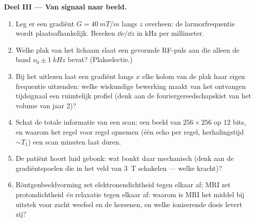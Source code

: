 \begin{problem}
\medskip\noindent\textbf{Deel III --- Van signaal naar beeld.}
\begin{enumerate}[resume]
  \item Leg er een gradiënt $G = \qty{40}{mT/m}$ langs $z$ overheen: de
        larmorfrequentie wordt plaatsafhankelijk. Bereken $\dd\nu/\dd z$
        in kHz per millimeter.
  \item Welke plak van het lichaam slaat een gevormde RF-puls aan die
        alleen de band $\nu_0 \pm
        \qty{1}{kHz}$ bevat? (Plakselectie.)
  \item Bij het uitlezen laat een gradiënt langs $x$ elke kolom van de
        plak haar eigen frequentie uitzenden: welke wiskundige bewerking
        maakt van het ontvangen tijdsignaal een ruimtelijk profiel (denk
        aan de fouriergereedschapskist van het volume van jaar 2)?
  \item Schat de totale informatie van een scan: een beeld van $256 \times 256$ op 12 bits, en waarom het regel voor regel opnemen
        (één echo per regel, herhalingstijd $\sim T_1$) een scan minuten
        laat duren.
  \item De patiënt hoort luid gebonk: wat bonkt daar mechanisch (denk
        aan de gradiëntspoelen die in het veld van \qty{3}{T} schakelen
        --- welke kracht)?
  \item Röntgenbeeldvorming zet elektronendichtheid tegen elkaar af; MRI
        zet protondichtheid \emph{én} relaxatie tegen elkaar af: waarom is
        MRI het middel bij uitstek voor zacht weefsel en de hersenen, en
        welke ioniserende dosis levert zij?
\end{enumerate}


\end{problem}
